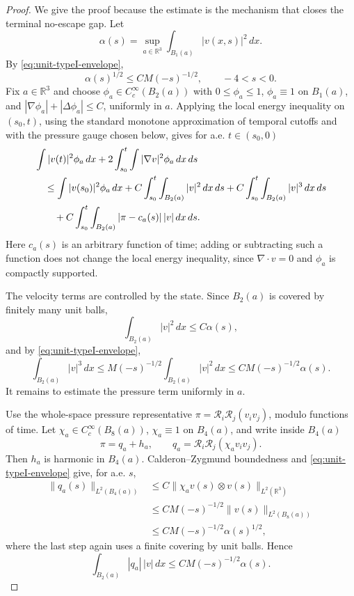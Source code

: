 \documentclass[11pt]{amsart}
\theoremstyle{plain}
\theoremstyle{definition}
\theoremstyle{remark}
\begin{document}
\begin{proof}
We give the proof because the estimate is the mechanism that closes the
terminal no-escape gap.  Let
\[
  \alpha(s)=\sup_{a\in\mathbb R^3}\int_{B_1(a)} |v(x,s)|^2\,dx .
\]
By \eqref{eq:unit-typeI-envelope},
\begin{equation}\label{eq:alpha-typeI-trivial}
  \alpha(s)^{1/2}\le C M(-s)^{-1/2},
  \qquad -4<s<0 .
\end{equation}
Fix \(a\in\mathbb R^3\) and choose
\(\phi_a\in C_c^\infty(B_2(a))\) with
\(0\le\phi_a\le1\), \(\phi_a\equiv1\) on \(B_1(a)\), and
\(|\nabla\phi_a|+|\Delta\phi_a|\le C\), uniformly in \(a\).  Applying the
local energy inequality on \((s_0,t)\), using the standard monotone
approximation of temporal cutoffs and with the pressure gauge chosen below,
gives for a.e. \(t\in(s_0,0)\)
\begin{align}
 &\int |v(t)|^2\phi_a\,dx
   +2\int_{s_0}^{t}\int |\nabla v|^2\phi_a\,dx\,ds       \notag \\
 &\quad\le
   \int |v(s_0)|^2\phi_a\,dx
   +C\int_{s_0}^{t}\int_{B_2(a)} |v|^2\,dx\,ds
   +C\int_{s_0}^{t}\int_{B_2(a)} |v|^3\,dx\,ds          \notag \\
 &\qquad
   +C\int_{s_0}^{t}\int_{B_2(a)}
       |\pi-c_a(s)|\,|v|\,dx\,ds .
\label{eq:lei-unit-estimate}
\end{align}
Here \(c_a(s)\) is an arbitrary function of time; adding or subtracting such a
function does not change the local energy inequality, since
\(\nabla\cdot v=0\) and \(\phi_a\) is compactly supported.

The velocity terms are controlled by the state.  Since \(B_2(a)\) is covered by
finitely many unit balls,
\[
  \int_{B_2(a)} |v|^2\,dx\le C\alpha(s),
\]
and by \eqref{eq:unit-typeI-envelope},
\begin{equation}\label{eq:cubic-unit-bound}
  \int_{B_2(a)} |v|^3\,dx
  \le M(-s)^{-1/2}\int_{B_2(a)} |v|^2\,dx
  \le C M(-s)^{-1/2}\alpha(s).
\end{equation}
It remains to estimate the pressure term uniformly in \(a\).

Use the whole-space pressure representative
\(\pi=\mathcal R_i\mathcal R_j(v_i v_j)\), modulo functions of time.  Let
\(\chi_a\in C_c^\infty(B_8(a))\), \(\chi_a\equiv1\) on \(B_4(a)\), and write
inside \(B_4(a)\)
\[
  \pi=q_a+h_a,
  \qquad
  q_a=\mathcal R_i\mathcal R_j(\chi_a v_i v_j).
\]
Then \(h_a\) is harmonic in \(B_4(a)\).  Calderon--Zygmund boundedness
\cite{Stein1970} and \eqref{eq:unit-typeI-envelope} give, for a.e. \(s\),
\begin{align*}
  \|q_a(s)\|_{L^2(B_4(a))}
  &\le C\|\chi_a v(s)\otimes v(s)\|_{L^2(\mathbb R^3)}  \\
  &\le C M(-s)^{-1/2}\|v(s)\|_{L^2(B_8(a))}             \\
  &\le C M(-s)^{-1/2}\alpha(s)^{1/2},
\end{align*}
where the last step again uses a finite covering by unit balls.  Hence
\begin{equation}\label{eq:local-pressure-unit}
  \int_{B_2(a)} |q_a|\,|v|\,dx
  \le C M(-s)^{-1/2}\alpha(s).
\end{equation}


\end{proof}
\end{document}
